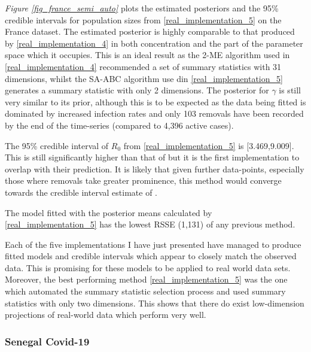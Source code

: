 \documentclass[11pt,a4paper]{article}
\theoremstyle{break}
\begin{document}
  \par \textit{Figure \ref{fig_france_semi_auto}} plots the estimated posteriors and the 95\% credible intervals for population sizes from \ref{real_implementation_5} on the France dataset. The estimated posterior is highly comparable to that produced by \ref{real_implementation_4} in both concentration and the part of the parameter space which it occupies. This is an ideal result as the 2-ME algorithm used in \ref{real_implementation_4} recommended a set of summary statistics with 31 dimensions, whilst the SA-ABC algorithm use din \ref{real_implementation_5} generates a summary statistic with only 2 dimensions. The posterior for $\gamma$ is still very similar to its prior, although this is to be expected as the data being fitted is dominated by increased infection rates and only 103 removals have been recorded by the end of the time-series (compared to 4,396 active cases).

  \par The 95\% credible interval of $R_0$ from \ref{real_implementation_5} is [3.469,9.009]. This is still significantly higher than that of \cite[]{estimated_r0_covid_19} but it is the first implementation to overlap with their prediction. It is likely that given further data-points, especially those where removals take greater prominence, this method would converge towards the credible interval estimate of \cite[]{estimated_r0_covid_19}.

  \par The model fitted with the posterior means calculated by \ref{real_implementation_5} has the lowest RSSE (1,131) of any previous method.

  \par Each of the five implementations I have just presented have managed to produce fitted models and credible intervals which appear to closely match the observed data. This is promising for these models to be applied to real world data sets. Moreover, the best performing method \ref{real_implementation_5} was the one which automated the summary statistic selection process and used summary statistics with only two dimensions. This shows that there do exist low-dimension projections of real-world data which perform very well.

\subsubsection{Senegal Covid-19}\label{sec_real_data_senegal}

\end{document}
